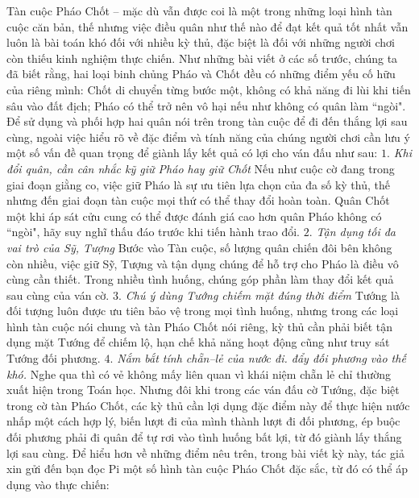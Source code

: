 \vspace*{175pt}
\begin{multicols}{2}
	Tàn cuộc Pháo Chốt -- mặc dù vẫn được coi là một trong những loại hình tàn cuộc căn bản, thế nhưng việc điều quân như thế nào để đạt kết quả tốt nhất vẫn luôn  là bài toán khó đối với nhiều kỳ thủ, đặc biệt là đối với những người chơi còn thiếu kinh nghiệm thực chiến. Như những bài viết ở các số trước, chúng ta đã biết rằng, hai loại binh chủng Pháo và Chốt đều có những điểm yếu cố hữu của riêng mình: Chốt di chuyển từng bước một, không có khả năng đi lùi khi tiến sâu vào đất địch; Pháo có thể trở nên vô hại nếu như không có quân làm ``ngòi". 
	\vskip 0.05cm
	Để sử dụng và phối hợp hai quân nói trên trong tàn cuộc để đi đến thắng lợi sau cùng, ngoài việc hiểu rõ về đặc điểm và tính năng của chúng người chơi cần lưu ý một số vấn đề quan trọng để giành lấy kết quả có lợi cho ván đấu như sau:
	\vskip 0.05cm
	\textit{$1.$\color{gocco}	Khi đổi quân, cần cân nhắc kỹ giữ Pháo hay giữ Chốt}
	\vskip 0.05cm
	Nếu như cuộc cờ đang trong giai đoạn giằng co, việc giữ Pháo là sự ưu tiên lựa chọn của đa số kỳ thủ, thế nhưng đến giai đoạn tàn cuộc mọi thứ có thể thay đổi hoàn toàn. Quân Chốt một khi áp sát cửu cung có thể được đánh giá cao hơn quân Pháo không có ``ngòi", hãy suy nghĩ thấu đáo trước khi tiến hành trao đổi.
	\vskip 0.1cm
	\textit{$2.$\color{gocco}	Tận dụng tối đa vai trò của Sỹ, Tượng}
	\vskip 0.1cm
	Bước vào Tàn cuộc, số lượng quân chiến đôi bên không còn nhiều, việc giữ Sỹ, Tượng và tận dụng chúng để hỗ trợ cho Pháo là điều vô cùng cần thiết. Trong nhiều tình huống, chúng góp phần làm thay đổi kết quả sau cùng của ván cờ.
	\vskip 0.1cm
	\textit{$3.$\color{gocco}	Chú ý dùng Tướng chiếm mặt đúng thời điểm}
	\vskip 0.1cm
	Tướng là đối tượng luôn được ưu tiên bảo vệ trong mọi tình huống, nhưng trong các loại hình tàn cuộc nói chung và tàn Pháo Chốt nói riêng, kỳ thủ cần phải  biết tận dụng mặt Tướng để chiếm lộ, hạn chế khả năng hoạt động cũng như truy sát Tướng đối phương.
	\vskip 0.1cm
	\textit{$4.$\color{gocco}	Nắm bắt tính chẵn--lẻ của nước đi. đẩy đối phương vào thế khó.}
	\vskip 0.1cm
	Nghe qua thì có vẻ không mấy liên quan vì khái niệm chẵn lẻ chỉ thường xuất hiện trong Toán học. Nhưng đôi khi trong các ván đấu cờ Tướng, đặc biệt trong cờ tàn Pháo Chốt, các kỳ thủ cần lợi dụng đặc điểm này để thực hiện nước nhấp một cách hợp lý, biến lượt đi của mình thành lượt đi đối phương, ép buộc đối phương phải đi quân để tự rơi vào tình huống bất lợi, từ đó giành lấy thắng lợi sau cùng.
	\vskip 0.1cm
	Để hiểu hơn về những điểm nêu trên, trong bài viết kỳ này, tác giả xin gửi đến bạn đọc Pi một số hình tàn cuộc Pháo Chốt đặc sắc, từ đó có thể áp dụng vào thực chiến:

\end{multicols}
